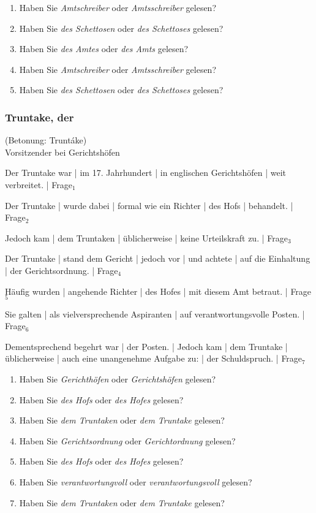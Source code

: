 \begin{enumerate}
\item Haben Sie \textit{Amtschreiber} oder \textit{Amtsschreiber} gelesen?   
\item Haben Sie \textit{des Schettosen} oder \textit{des Schettoses} gelesen?   
\item Haben Sie \textit{des Amtes} oder \textit{des Amts} gelesen?  
\item Haben Sie \textit{Amtschreiber} oder \textit{Amtsschreiber} gelesen?   
\item Haben Sie \textit{des Schettosen} oder \textit{des Schettoses} gelesen?
\end{enumerate}

\subsubsection*{Truntake, der}
(Betonung: Truntáke)\\
Vorsitzender bei Gerichtshöfen
\begin{SchmittAppendixList}
\item Der Truntake war | im 17. Jahrhundert | in englischen Gerichtshöfen | weit verbreitet. | Frage$_1$ 
\item Der Truntake | wurde dabei | formal wie ein Richter | des Hofs | behandelt. | Frage$_2$ 
\item Jedoch kam | dem Truntaken | üblicherweise | keine Urteilskraft zu. | Frage$_3$ 
\item Der Truntake | stand dem Gericht | jedoch vor | und achtete | auf die Einhaltung | der Gerichtsordnung. | Frage$_4$ 
\item Häufig wurden | angehende Richter | des Hofes | mit diesem Amt betraut. | Frage$_5$  
\item Sie galten |  als vielversprechende Aspiranten | auf verantwortungsvolle Posten. | Frage$_6$ 
\item Dementsprechend begehrt war | der Posten. | Jedoch kam | dem Truntake | üblicherweise | auch eine unangenehme Aufgabe zu: | der Schuldspruch. | Frage$_7$ 
\end{SchmittAppendixList}

\begin{enumerate}
\item Haben Sie \textit{Gerichthöfen} oder \textit{Gerichtshöfen} gelesen?   
\item Haben Sie \textit{des Hofs} oder \textit{des Hofes} gelesen? 
\item Haben Sie \textit{dem Truntaken} oder \textit{dem Truntake} gelesen?  
\item Haben Sie \textit{Gerichtsordnung} oder \textit{Gerichtordnung} gelesen?  
\item Haben Sie \textit{des Hofs} oder \textit{des Hofes} gelesen?  
\item Haben Sie \textit{verantwortungvoll} oder \textit{verantwortungsvoll} gelesen?   
\item Haben Sie \textit{dem Truntaken} oder \textit{dem Truntake} gelesen?
\end{enumerate}

